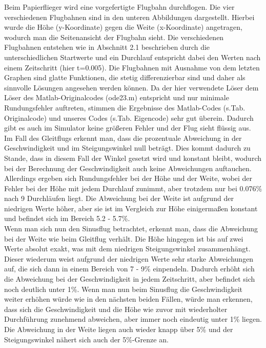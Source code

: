 \documentclass[a4paper,12pt]{scrartcl}
\begin{document}
Beim Papierflieger wird eine vorgefertigte Flugbahn durchflogen. Die vier verschiedenen
Flugbahnen sind in den unteren Abbildungen dargestellt. Hierbei wurde die Höhe (y-Koordinate) gegen
die Weite (x-Koordinate) angetragen, wodurch man die Seitenansicht der Flugbahn
sieht. Die verschiedenen Flugbahnen entstehen wie in Abschnitt 2.1 beschrieben durch
die unterschiedlichen Startwerte und ein Durchlauf entspricht dabei den Werten nach einem Zeitschritt (hier t=0.005).  Die Flugbahnen mit Ausnahme von dem letzten Graphen sind glatte Funktionen, die stetig differenzierbar
sind und daher als sinnvolle Lösungen angesehen werden können.
Da der hier verwendete Löser dem Löser des Matlab-Originalcodes (ode23.m) entspricht
und nur minimale Rundungsfehler auftreten, stimmen die Ergebnisse des Matlab-Codes
(s.Tab. Originalcode) und unseres Codes (s.Tab. Eigencode) sehr gut überein. Dadurch gibt es auch im
Simulator keine größeren Fehler und der Flug sieht flüssig aus. \\
Im Fall des Gleitflugs erkennt man, dass die prozentuale Abweichung in der Geschwindigkeit und im Steigungswinkel null beträgt. Dies kommt dadurch zu Stande, dass in diesem Fall der Winkel gesetzt wird und konstant bleibt, wodurch bei der Berechnung der Geschwindigkeit auch keine Abweichungen auftauchen. Allerdings ergeben sich Rundungsfehler bei der Höhe und der Weite, wobei der Fehler bei der Höhe mit jedem Durchlauf zunimmt, aber trotzdem nur bei 0.076\% nach 9 Durchläufen liegt. Die Abweichung bei der Weite ist aufgrund der niedrigen Werte höher, aber sie ist im Vergleich zur Höhe einigermaßen konstant und befindet sich im Bereich 5.2 - 5.7\%.\\
Wenn man sich nun den Sinusflug betrachtet, erkennt man, dass die Abweichung bei der Weite wie beim Gleitflug verhält. Die Höhe hingegen ist bis auf zwei Werte absolut exakt, was mit dem niedrigen Steigungswinkel zusammenhängt. Dieser wiederum weist aufgrund der niedrigen Werte sehr starke Abweichungen auf, die sich dann in einem Bereich von 7 - 9\% einpendeln. Dadurch erhöht sich die Abweichung bei der Geschwindigkeit in jedem Zeitschritt, aber befindet sich noch deutlich unter 1\%. Wenn man nun beim Sinusflug die Geschwindigkeit weiter erhöhen würde wie in den nächsten beiden Fällen, würde man erkennen, dass sich die Geschwindigkeit und die Höhe wie zuvor mit wiederholter Durchführung zunehmend abweichen, aber immer noch eindeutig unter 1\% liegen. Die Abweichung in der Weite liegen auch wieder knapp über 5\% und der Steigungswinkel nähert sich auch der 5\%-Grenze an.
\end{document}
